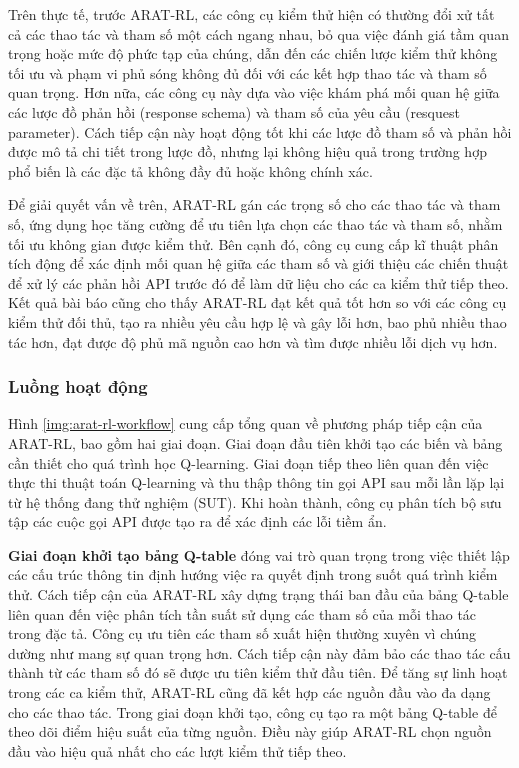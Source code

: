 Trên thực tế, trước ARAT-RL, các công cụ kiểm thử hiện có thường đổi xử tất cả các thao tác và tham số một cách ngang nhau, bỏ qua việc đánh giá tầm quan trọng hoặc mức độ phức tạp của chúng, dẫn đến các chiến lược kiểm thử không tối ưu và phạm vi phủ sóng không đủ đối với các kết hợp thao tác và tham số quan trọng. Hơn nữa, các công cụ này dựa vào việc khám phá mối quan hệ giữa các lược đồ phản hồi (response schema) và tham số của yêu cầu (resquest parameter). Cách tiếp cận này hoạt động tốt khi các lược đồ tham số và phản hồi được mô tả chi tiết trong lược đồ, nhưng lại không hiệu quả trong trường hợp phổ biến là các đặc tả không đầy đủ hoặc không chính xác.

Để giải quyết vấn về trên, ARAT-RL gán các trọng số cho các thao tác và tham số, ứng dụng học tăng cường để ưu tiên lựa chọn các thao tác và tham số, nhằm tối ưu không gian được kiểm thử. Bên cạnh đó, công cụ cung cấp kĩ thuật phân tích động để xác định mối quan hệ giữa các tham số và giới thiệu các chiến thuật để xử lý các phản hồi API trước đó để làm dữ liệu cho các ca kiểm thử tiếp theo. Kết quả bài báo cũng cho thấy ARAT-RL đạt kết quả tốt hơn so với các công cụ kiểm thử đối thủ, tạo ra nhiều yêu cầu hợp lệ và gây lỗi hơn, bao phủ nhiều thao tác hơn, đạt được độ phủ mã nguồn cao hơn và tìm được nhiều lỗi dịch vụ hơn.

\subsubsection{Luồng hoạt động}

Hình \ref{img:arat-rl-workflow} cung cấp tổng quan về phương pháp tiếp cận của ARAT-RL, bao gồm hai giai đoạn. Giai đoạn đầu tiên khởi tạo các biến và bảng cần thiết cho quá trình học Q-learning. Giai đoạn tiếp theo liên quan đến việc thực thi thuật toán Q-learning và thu thập thông tin gọi API sau mỗi lần lặp lại từ hệ thống đang thử nghiệm (SUT). Khi hoàn thành, công cụ phân tích bộ sưu tập các cuộc gọi API được tạo ra để xác định các lỗi tiềm ẩn.


\textbf{Giai đoạn khởi tạo bảng Q-table} đóng vai trò quan trọng trong việc thiết lập các cấu trúc thông tin định hướng việc ra quyết định trong suốt quá trình kiểm thử. Cách tiếp cận của ARAT-RL xây dựng trạng thái ban đầu của bảng Q-table liên quan đến việc phân tích tần suất sử dụng các tham số của mỗi thao tác trong đặc tả. Công cụ ưu tiên các tham số xuất hiện thường xuyên vì chúng dường như mang sự quan trọng hơn. Cách tiếp cận này đảm bảo các thao tác cấu thành từ các tham số đó sẽ được ưu tiên kiểm thử đầu tiên. Để tăng sự linh hoạt trong các ca kiểm thử, ARAT-RL cũng đã kết hợp các nguồn đầu vào đa dạng cho các thao tác. Trong giai đoạn khởi tạo, công cụ tạo ra một bảng Q-table để theo dõi điểm hiệu suất của từng nguồn. Điều này giúp ARAT-RL chọn nguồn đầu vào hiệu quả nhất cho các lượt kiểm thử tiếp theo.

